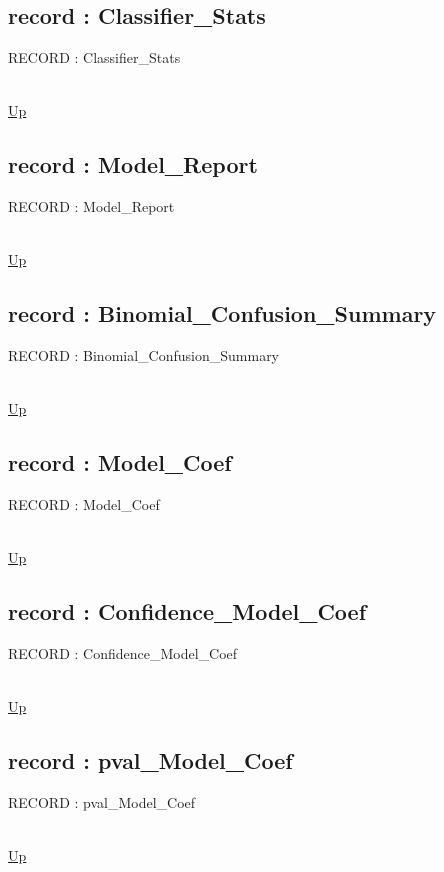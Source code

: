 \subsection*{record : Classifier\_Stats}
\hypertarget{ecldoc:logisticregression.types.classifier_stats}{RECORD : Classifier\_Stats} \\
\hyperlink{ecldoc:LogisticRegression.Types}{Up} \\
\par
\subsection*{record : Model\_Report}
\hypertarget{ecldoc:logisticregression.types.model_report}{RECORD : Model\_Report} \\
\hyperlink{ecldoc:LogisticRegression.Types}{Up} \\
\par
\subsection*{record : Binomial\_Confusion\_Summary}
\hypertarget{ecldoc:logisticregression.types.binomial_confusion_summary}{RECORD : Binomial\_Confusion\_Summary} \\
\hyperlink{ecldoc:LogisticRegression.Types}{Up} \\
\par
\subsection*{record : Model\_Coef}
\hypertarget{ecldoc:logisticregression.types.model_coef}{RECORD : Model\_Coef} \\
\hyperlink{ecldoc:LogisticRegression.Types}{Up} \\
\par
\subsection*{record : Confidence\_Model\_Coef}
\hypertarget{ecldoc:logisticregression.types.confidence_model_coef}{RECORD : Confidence\_Model\_Coef} \\
\hyperlink{ecldoc:LogisticRegression.Types}{Up} \\
\par
\subsection*{record : pval\_Model\_Coef}
\hypertarget{ecldoc:logisticregression.types.pval_model_coef}{RECORD : pval\_Model\_Coef} \\
\hyperlink{ecldoc:LogisticRegression.Types}{Up} \\
\par
